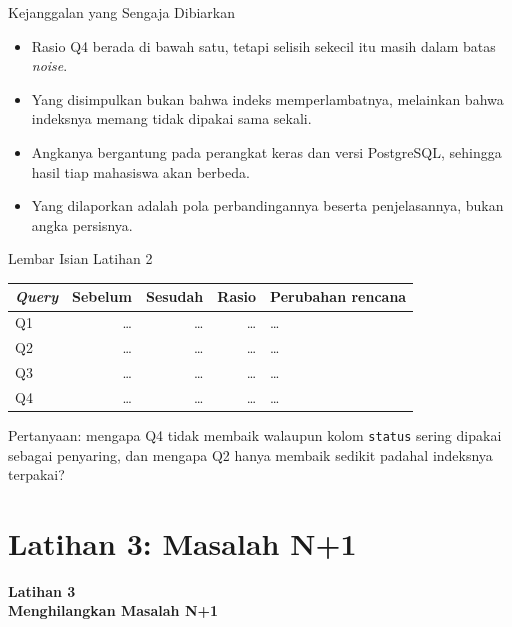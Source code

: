 \documentclass[aspectratio=169, table, 12pt]{beamer}
\begin{document}
\begin{frame}{{\Large Kejanggalan yang Sengaja Dibiarkan}}
  \vspace{10pt}
  \begin{itemize}
    \item Rasio Q4 berada di bawah satu, tetapi selisih sekecil itu masih
          dalam batas \textit{noise}.
    \item Yang disimpulkan bukan bahwa indeks memperlambatnya, melainkan
          bahwa indeksnya memang tidak dipakai sama sekali.
    \item Angkanya bergantung pada perangkat keras dan versi PostgreSQL,
          sehingga hasil tiap mahasiswa akan berbeda.
    \item Yang dilaporkan adalah pola perbandingannya beserta penjelasannya,
          bukan angka persisnya.
  \end{itemize}
\end{frame}

\begin{frame}{{\Large Lembar Isian Latihan 2}}
  \vspace{5pt}
  {\centering
  {\small
  \begin{tabularx}{\textwidth}{lrrrX}
    \hline
    \textbf{\textit{Query}} & \textbf{Sebelum} & \textbf{Sesudah} & \textbf{Rasio} & \textbf{Perubahan rencana} \\
    \hline
    Q1 & \dots & \dots & \dots & \dots \\
    \hline
    Q2 & \dots & \dots & \dots & \dots \\
    \hline
    Q3 & \dots & \dots & \dots & \dots \\
    \hline
    Q4 & \dots & \dots & \dots & \dots \\
    \hline
  \end{tabularx}}\par}

  \vspace{8pt}
  {\footnotesize Pertanyaan: mengapa Q4 tidak membaik walaupun kolom
  \texttt{status} sering dipakai sebagai penyaring, dan mengapa Q2 hanya
  membaik sedikit padahal indeksnya terpakai?}
\end{frame}

\section{Latihan 3: Masalah N+1}

\begin{frame}{\hfill}
  \centering
  \Huge{\textbf{Latihan 3\\Menghilangkan Masalah N+1}}
\end{frame}
\end{document}
